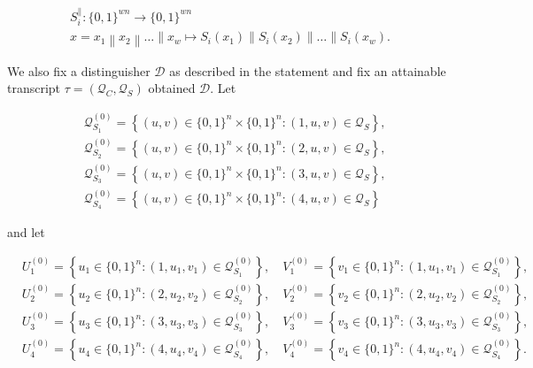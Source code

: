 $$
\begin{array}{c}
{S_{i}^{\|}:\{0,1\}^{w n} \rightarrow\{0,1\}^{w n}} \\
{x=x_{1}\left\|x_{2}\right\| \ldots\left\|x_{w} \longmapsto S_{i}\left(x_{1}\right)\right\| S_{i}\left(x_{2}\right)\|\ldots\| S_{i}\left(x_{w}\right)}.
\end{array}
$$

We also fix a distinguisher $\mathcal{D}$ as described in the statement and fix an attainable transcript $\tau =\left(\mathcal{Q}_{C}, \mathcal{Q}_{S}\right)$ obtained $\mathcal{D}$. Let

$$
\begin{aligned}
&\mathcal{Q}_{S_{1}}^{(0)}=\left\{(u, v) \in\{0,1\}^{n} \times\{0,1\}^{n}:(1, u, v) \in \mathcal{Q}_{S} \right\},\\
&\mathcal{Q}_{S_{2}}^{(0)}=\left\{(u, v) \in\{0,1\}^{n} \times\{0,1\}^{n}:(2, u, v) \in \mathcal{Q}_{S} \right\},\\
&\mathcal{Q}_{S_{3}}^{(0)}=\left\{(u, v) \in\{0,1\}^{n} \times\{0,1\}^{n}:(3, u, v) \in \mathcal{Q}_{S} \right\},\\
&\mathcal{Q}_{S_{4}}^{(0)}=\left\{(u, v) \in\{0,1\}^{n} \times\{0,1\}^{n}:(4, u, v) \in \mathcal{Q}_{S} \right\}
\end{aligned}
$$

\noindent and let

$$
\begin{aligned}
&U_{1}^{(0)}=\left\{u_{1} \in\{0,1\}^{n}:\left(1, u_{1}, v_{1}\right) \in \mathcal{Q}_{S_{1}}^{(0)}\right\}, \quad V_{1}^{(0)}=\left\{v_{1} \in\{0,1\}^{n}:\left(1, u_{1}, v_{1}\right) \in \mathcal{Q}_{S_{1}}^{(0)}\right\},\\
&U_{2}^{(0)}=\left\{u_{2} \in\{0,1\}^{n}:\left(2, u_{2}, v_{2}\right) \in \mathcal{Q}_{S_{2}}^{(0)}\right\}, \quad V_{2}^{(0)}=\left\{v_{2} \in\{0,1\}^{n}:\left(2, u_{2}, v_{2}\right) \in \mathcal{Q}_{S_{2}}^{(0)}\right\},\\
&U_{3}^{(0)}=\left\{u_{3} \in\{0,1\}^{n}:\left(3, u_{3}, v_{3}\right) \in \mathcal{Q}_{S_{3}}^{(0)}\right\}, \quad V_{3}^{(0)}=\left\{v_{3} \in\{0,1\}^{n}:\left(3, u_{3}, v_{3}\right) \in \mathcal{Q}_{S_{3}}^{(0)}\right\},\\
&U_{4}^{(0)}=\left\{u_{4} \in\{0,1\}^{n}:\left(4, u_{4}, v_{4}\right) \in \mathcal{Q}_{S_{4}}^{(0)}\right\}, \quad V_{4}^{(0)}=\left\{v_{4} \in\{0,1\}^{n}:\left(4, u_{4}, v_{4}\right) \in \mathcal{Q}_{S_{4}}^{(0)}\right\}.
\end{aligned}
$$

